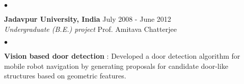 \documentclass[margin,line]{res}
\newenvironment{list2}{
  \begin{list}{$\bullet$}{%
      \setlength{\itemsep}{0in}
      \setlength{\parsep}{0in} \setlength{\parskip}{0in}
      \setlength{\topsep}{0in} \setlength{\partopsep}{0in} 
      \setlength{\leftmargin}{0.2in}}}{\end{list}}
\begin{document}
\begin{resume}
\begin{list2}
  \end{list2}
  
\vspace*{-0.15in}
{\bf Jadavpur University, India}  \hfill July 2008 - June 2012 \\
\textit{Undergraduate (B.E.) project} \hfill Prof. Amitava Chatterjee\\
	\vspace*{-0.05in}
\begin{list2}
	\vspace*{-0.05in}
	\item \textbf{Vision based door detection} : %
	Developed a  door detection algorithm for mobile robot navigation by generating proposals for candidate door-like structures based on geometric features.\\
\end{list2}


%
%



\end{resume}
\end{document}
